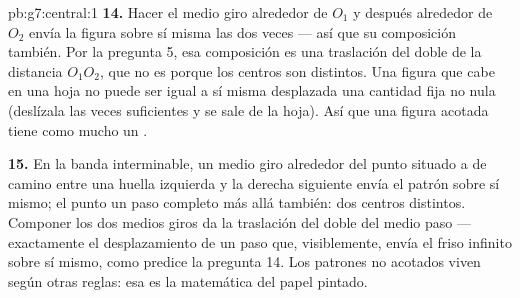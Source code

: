 \begin{solution}{pb:g7:central:1}
\textbf{14.} Hacer el medio giro alrededor de $O_1$ y después alrededor de
$O_2$ envía la figura sobre sí misma las dos veces --- así que su
composición también. Por la pregunta 5, esa composición es una
traslación del doble de la distancia $O_1 O_2$, que no es 
porque los centros son distintos. Una figura que cabe en una hoja no puede
ser igual a sí misma desplazada una cantidad fija no nula (deslízala las veces
suficientes y se sale de la hoja). Así que una figura acotada tiene
como mucho un .

\textbf{15.} En la banda interminable, un medio giro alrededor del punto
situado a  de camino entre una huella izquierda y la derecha siguiente
envía el patrón sobre sí mismo; el punto un paso completo más allá
también: dos centros distintos. Componer los dos medios giros
da la traslación del doble del medio paso --- exactamente el
desplazamiento de un paso que, visiblemente, envía el friso infinito sobre
sí mismo, como predice la pregunta 14. Los patrones no acotados viven según
otras reglas: esa es la matemática del papel pintado.
\end{solution}
